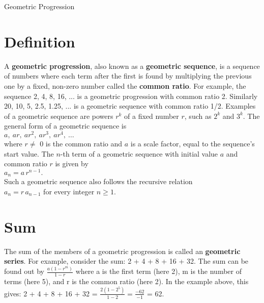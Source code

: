\documentclass{article}
\begin{document}
\newpage

\begin{center}
\vspace{100pt}
{\LARGE Geometric Progression}
\end{center}
\section*{Definition}
 A \textbf{geometric progression}, also known as a \textbf{geometric sequence}, is a sequence of numbers where each term after the first is found by multiplying the previous one by a fixed, non-zero number called the \textbf{common ratio}.\newline
For example, the sequence 2, 4, 8, 16, ... is a geometric progression with common ratio 2. Similarly 20, 10, 5, 2.5, 1.25, ... is a geometric sequence with common ratio 1/2.\newline
Examples of a geometric sequence are powers $r^k$ of a fixed number $r$, such as $2^k$ and $3^k$. The general form of a geometric sequence is\\
$a,\ ar,\ ar^2,\ ar^3,\ ar^4,\ \ldots$\\
where $r \ne$ 0 is the common ratio and $a$ is a scale factor, equal to the sequence's start value.\newline
The $n$-th term of a geometric sequence with initial value $a$ and common ratio $r$ is given by\\
$a_n = a\,r^{n-1}.$\\
Such a geometric sequence also follows the recursive relation\\
$a_n = r\,a_{n-1}$ for every integer $n\geq 1$.
\section*{Sum}
The sum of the members of a geometric progression is called an \textbf{geometric series}. For example, consider the sum:
2 + 4 + 8 + 16 + 32.
The sum can be found out by\newline
$\frac{a(1-r^m)}{1-r}$ where a is the first term (here 2), m is the number of terms (here 5), and r is the common ratio (here 2).
In the example above, this gives:
2 + 4 + 8 + 16 + 32 = $\frac{2(1-2^5)}{1-2} = \frac{-62}{-1}$ = 62.	
\end{document}
